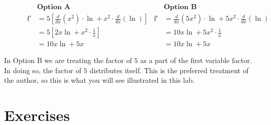 \documentclass[12pt,]{book}
\theoremstyle{plain}
\theoremstyle{definition}
\numberwithin{equation}{section}
\newcommand{\fe}[2]{\mathop{{#1}{\left(#2\right)}}}
\newcommand{\fd}[1]{#1'}
\newcommand{\lzoo}[2]{{\frac{d}{d#1}}{\left(#2\right)}}
\begin{document}
\begin{figure}
\centering
\begin{align*}
&\textbf{Option A}&&\textbf{Option B}\\
\fe{\fd{f}}{x}&=5\left[\lzoo{x}{x^2}\cdot\fe{\ln}{x}+x^2\cdot\lzoo{x}{\fe{\ln}{x}}\right]&\fe{\fd{f}}{x}&=\lzoo{x}{5x^2}\cdot\fe{\ln}{x}+5x^2\cdot\lzoo{x}{\fe{\ln}{x}}\\
&=5\left[2x\fe{\ln}{x}+x^2\cdot\frac{1}{x}\right]&&=10x\fe{\ln}{x}+5x^2\cdot\frac{1}{x}\\
&=10x\fe{\ln}{x}+5x&&=10x\fe{\ln}{x}+5x
\end{align*}%
\caption{\label{figure-constant-factors-with-product-rule}}
\end{figure}
\par
In Option B we are treating the factor of \(5\) as a part of the first variable factor.  In doing so, the factor of \(5\) distributes itself.  This is the preferred treatment of the author, so this is what you will see illustrated in this lab.%
\typeout{************************************************}
\typeout{************************************************}
\section*{Exercises}\label{exercises-33}
\end{document}
